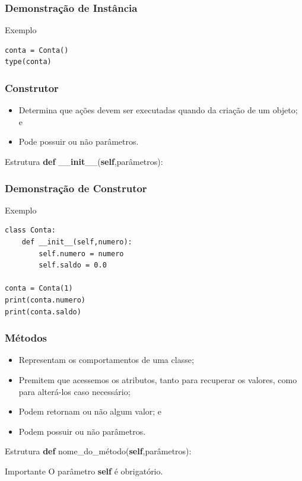 \documentclass{beamer}
\begin{document}
\begin{frame}[fragile]
	\frametitle{Demonstração de Instância}
	
	\begin{exampleblock}{Exemplo}
		\begin{lstlisting}
conta = Conta()
type(conta)        
\end{lstlisting}
	\end{exampleblock}
\end{frame}

\begin{frame}
	\frametitle{Construtor}
	
	\begin{itemize}
		\item Determina que ações devem ser executadas quando da criação de um objeto; e
		\item Pode possuir ou não parâmetros.
	\end{itemize} \vfill
	
	\begin{block}{Estrutura}
	\textbf{def} \_\_\textbf{init}\_\_(\textbf{self},parâmetros):
	\end{block}
\end{frame}

\begin{frame}[fragile]
	\frametitle{Demonstração de Construtor}
	
	\begin{exampleblock}{Exemplo}
		\begin{lstlisting}
class Conta:
    def __init__(self,numero):
        self.numero = numero
        self.saldo = 0.0
			    			   			
conta = Conta(1)	
print(conta.numero)
print(conta.saldo)
		\end{lstlisting}
	\end{exampleblock}
\end{frame}


\begin{frame}
	\frametitle{Métodos}
	
	\begin{itemize}
		\item Representam os comportamentos de uma classe;
		\item Premitem que acessemos os atributos, tanto para recuperar os valores, como para alterá-los caso necessário;
		\item Podem retornam ou não algum valor; e
		\item Podem possuir ou não parâmetros.
	\end{itemize} \vfill 
	
	\begin{block}{Estrutura}
		\textbf{def} nome\_do\_método(\textbf{self},parâmetros):
	\end{block} \vfill
	
	\begin{alertblock}{Importante}
		O parâmetro \textbf{self} é obrigatório.
	\end{alertblock}
\end{frame}
\end{document}
